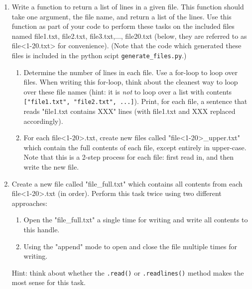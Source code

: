 \documentclass{article}[12pt]
\newcommand{\code}[1]{\texttt{#1}}  %
\begin{document}
\begin{enumerate}[itemsep=5ex]
	\item Write a function to return a list of lines in a given file. This function should take one argument, the file name, and return a list of the lines. Use this function as part of your code to perform these tasks on the included files named file1.txt, file2.txt, file3.txt,..., file20.txt (below, they are referred to as file<1-20.txt> for convenience). (Note that the code which generated these files is included in the python scipt \code{generate\_files.py}.)
	\begin{enumerate}[itemsep=2ex]
		\item Determine the number of lines in each file. Use a for-loop to loop over files. When writing this for-loop, think about the cleanest way to loop over these file names (hint: it is \emph{not} to loop over a list with contents \code{["file1.txt", "file2.txt", ...]}). Print, for each file, a sentence that reads "file1.txt contains XXX" lines (with file1.txt and XXX replaced accordingly).
		\item For each file<1-20>.txt, create new files called "file<1-20>\_upper.txt" which contain the full contents of each file, except entirely in upper-case. Note that this is a 2-step process for each file: first read in, and then write the new file. 
	\end{enumerate}
	
	\item Create a new file called "file\_full.txt" which contains all contents from each file<1-20>.txt (in order). Perform this task twice using two different approaches:
	
	\begin{enumerate}[itemsep=2ex]
		\item Open the "file\_full.txt" a single time for writing and write all contents to this handle.
		\item Using the "append" mode to open and close the file multiple times for writing.
	\end{enumerate}
	Hint: think about whether the \code{.read()} or \code{.readlines()} method makes the most sense for this task.
	

\end{enumerate}
\end{document}
